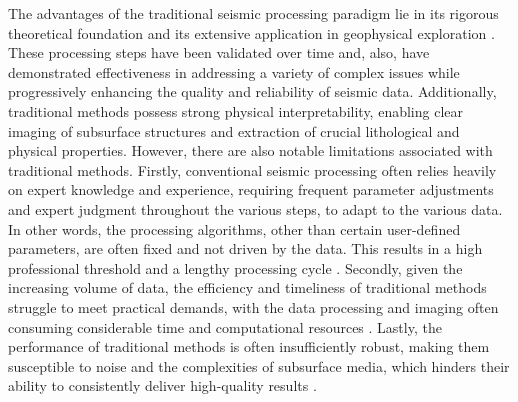 The advantages of the traditional seismic processing paradigm lie in its rigorous theoretical foundation and its extensive application in geophysical exploration \citep{yilmaz2001seismic}. These processing steps have been validated over time and, also, have demonstrated effectiveness in addressing a variety of complex issues while progressively enhancing the quality and reliability of seismic data. Additionally, traditional methods possess strong physical interpretability, enabling clear imaging of subsurface structures and extraction of crucial lithological and physical properties. However, there are also notable limitations associated with traditional methods. Firstly, conventional seismic processing often relies heavily on expert knowledge and experience, requiring frequent parameter adjustments and expert judgment throughout the various steps, to adapt to the various data. In other words, the processing algorithms, other than certain user-defined parameters, are often fixed and not driven by the data. This results in a high professional threshold and a lengthy processing cycle \citep{yu2021deep}. Secondly, given the increasing volume of data, the efficiency and timeliness of traditional methods struggle to meet practical demands, with the data processing and imaging often consuming considerable time and computational resources \citep{hou2021machine}. Lastly, the performance of traditional methods is often insufficiently robust, making them susceptible to noise and the complexities of subsurface media, which hinders their ability to consistently deliver high-quality results \citep{Li2020DLInversion}. 

